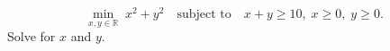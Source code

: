 \[
  \min_{x, y \in \mathbb{R}} \; x^{2} + y^{2}
  \quad \text{subject to} \quad
  x + y \geq 10, \; x \geq 0, \; y \geq 0.
\]
Solve for $x$ and $y$.
